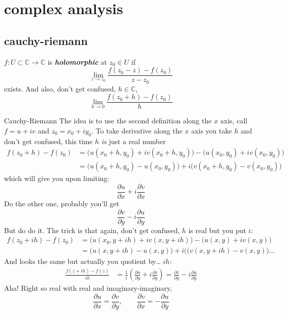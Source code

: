 \chapter{complex analysis}

\section{cauchy-riemann}

\(f:U \subset \mathbb{C} \to \mathbb{C}\) is \textit{\textbf{holomorphic}} at \(z_0\in U\) if
\[\lim_{z \to z_0} \frac{f(z_0-z)-f(z_0)}{z-z_0}\]
exists. And also, don't get confused, \(h\in \mathbb{C}\),
\[\lim_{h \to 0} \frac{f(z_0+h)-f(z_0)}{h}\]

\begin{thing7}{Cauchy-Riemann}\leavevmode
The idea is to use the second definition along the \(x\) axis, call \(f=u+iv\) and  \(z_0=x_0+iy_0\). To take derivative along the \(x\) axis you take \(h\) and don't get confused, this time \(h\) \textit{is} just a real number
\begin{align*}f(z_0+h)-f(z_0)&=\Big(u(x_0+h,y_0)+iv(x_0+h,y_0)\Big)-\Big(u(x_0,y_0)+iv(x_0,y_0)\Big)\\
&=\Big(u(x_0+h,y_0)-u(x_0,y_0)\Big)+i\Big(v(x_0+h,y_0)-v(x_0,y_0)\Big)
\end{align*}
which will give you upon limiting:
\[\frac{\partial u}{\partial x}+i\frac{\partial v}{\partial x}\]
Do the other one, probably you'll get
\[\frac{\partial v}{\partial y}-i\frac{\partial u}{\partial y}\]
But do do it. The trick is that again, don't get confused, \(h\) is real but you put \(i\):
\begin{align*}
f(z_0+ih)-f(z_0)&=\Big(u(x_0,y+ih)+iv(x,y+ih)\Big)-\Big(u(x,y)+iv(x,y)\Big)\\
&=\Big(u(x,y+ih)-u(x,y)\Big)+i\Big((v(x,y+ih)-v(x,y)\Big)\ldots
\end{align*}
And looks the same but actually you quotient by… \(ih\):
\begin{align*}\frac{f(z+ih)-f(z)}{ih}&=\frac{1}{i}\left(\frac{\partial u}{\partial y}+i\frac{\partial v}{\partial y}\right)=\frac{\partial v}{\partial y}-i\frac{\partial u}{\partial y}
	\end{align*}
Aha! Right so real with real and imaginary-imaginary,
\[\frac{\partial u}{\partial x}=\frac{\partial v}{\partial y},\qquad \frac{\partial v}{\partial x}=-\frac{\partial u}{\partial y}\]
\end{thing7}





